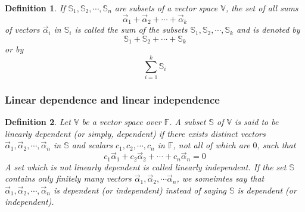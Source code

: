 \documentclass{article}
\newtheorem*{definition}{Definition}
\begin{document}
    \begin{definition}
        If \(\mathbb{S}_1, \mathbb{S}_2, \cdots, \mathbb{S}_n\) are subsets of a vector
        space \(\mathbb{V}\), the set of all sums
        \begin{equation*}
            \vec{\alpha}_1 + \vec{\alpha}_2 + \cdots + \vec{\alpha}_k
        \end{equation*}
        of vectors \(\vec{\alpha}_{i}\) in \(\mathbb{S}_i\) is called the sum of the subsets
        \(\mathbb{S}_1, \mathbb{S}_2, \cdots, \mathbb{S}_k\) and is
        denoted by 
        \[\mathbb{S}_1+\mathbb{S}_2+\cdots+\mathbb{S}_k\]
        or by 
        \[\sum_{i=1}^{k} \mathbb{S}_{i}\]
    \end{definition}

    \subsubsection{Linear dependence and linear independence}
    \begin{definition}
        Let \(\mathbb{V}\) be a vector space over \(\mathbb{F}\). A subset \(\mathbb{S}\)
        of \(\mathbb{V}\) is said to be linearly dependent (or simply, dependent) if there 
        exists distinct vectors \(\vec{\alpha}_1, \vec{\alpha}_2, \cdots, \vec{\alpha}_n\)
        in \(\mathbb{S}\) and scalars \(c_1, c_2, \cdots, c_n\) in \(\mathbb{F}\), not all
        of which are \(0\), such that 
        \begin{equation*}
            c_1 \vec{\alpha}_1 + c_2 \vec{\alpha}_2 + \cdots + c_n \vec{\alpha}_n = 0
        \end{equation*}
        A set which is not linearly dependent is called linearly independent. If the set 
        \(\mathbb{S}\) contains only finitely many vectors \(\vec{\alpha}_1, \vec{\alpha}_2, \cdots \vec{\alpha}_n\),
        we someimtes say that \(\vec{\alpha}_1, \vec{\alpha}_2, \cdots, \vec{\alpha}_n\) is 
        dependent (or independent) instead of saying \(\mathbb{S}\) is dependent (or independent).
    \end{definition}

\end{document}
